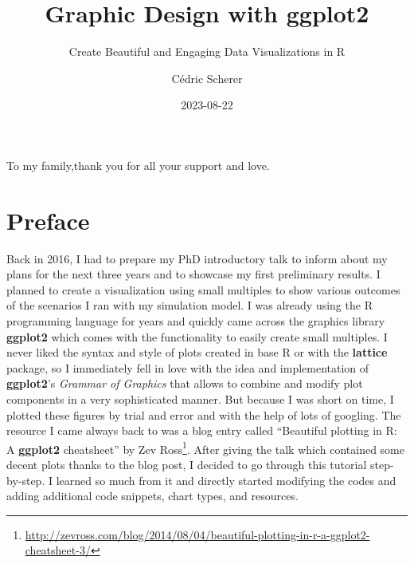 \documentclass[
]{krantz}
\title{Graphic Design with ggplot2}
\subtitle{Create Beautiful and Engaging Data Visualizations in R}
\author{Cédric Scherer}
\date{2023-08-22}
\renewcommand{\href}[2]{#2\footnote{\url{#1}}}
\begin{document}
\maketitle


\thispagestyle{empty}

\begin{center}
To my family,thank you for all your support and love.
\end{center}

\setlength{\abovedisplayskip}{-5pt}
\setlength{\abovedisplayshortskip}{-5pt}

{
\hypersetup{linkcolor=}
\setcounter{tocdepth}{2}
\tableofcontents
}
\listoffigures
\listoftables
\hypertarget{preface}{%
\chapter*{Preface}\label{preface}}


Back in 2016, I had to prepare my PhD introductory talk to inform about my plans for the next three years and to showcase my first preliminary results. I planned to create a visualization using small multiples to show various outcomes of the scenarios I ran with my simulation model. I was already using the R programming language for years and quickly came across the graphics library \textbf{ggplot2} which comes with the functionality to easily create small multiples. I never liked the syntax and style of plots created in base R or with the \textbf{lattice} package, so I immediately fell in love with the idea and implementation of \textbf{ggplot2}'s \emph{Grammar of Graphics} that allows to combine and modify plot components in a very sophisticated manner. But because I was short on time, I plotted these figures by trial and error and with the help of lots of googling. The resource I came always back to was a blog entry called \href{http://zevross.com/blog/2014/08/04/beautiful-plotting-in-r-a-ggplot2-cheatsheet-3/}{``Beautiful plotting in R: A \textbf{ggplot2} cheatsheet'' by Zev Ross}. After giving the talk which contained some decent plots thanks to the blog post, I decided to go through this tutorial step-by-step. I learned so much from it and directly started modifying the codes and adding additional code snippets, chart types, and resources.
\end{document}
